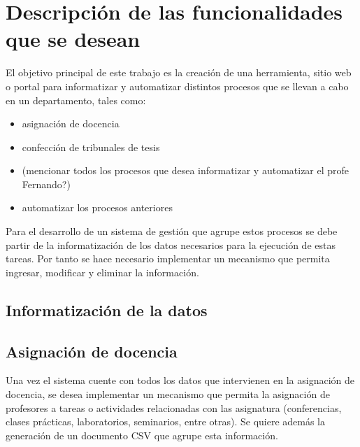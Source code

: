 \chapter{Descripción de las funcionalidades que se desean}\label{chapter:features}
El objetivo principal de este trabajo es la creación de
una herramienta, sitio web o portal para informatizar
y automatizar distintos procesos que se llevan a cabo 
en un departamento, tales como:

\begin{itemize}
    \item asignación de docencia
    \item confección de tribunales de tesis
    \item (mencionar todos los procesos que desea informatizar y automatizar el profe Fernando?)
    \item automatizar los procesos anteriores
\end{itemize}


Para el desarrollo de un sistema de gestión que agrupe estos 
procesos se debe partir de la informatización de los datos necesarios 
para la ejecución de estas tareas. Por tanto se hace necesario 
implementar un mecanismo que permita ingresar, modificar y eliminar
la información. 



\section{Informatización de la datos}





\section{Asignación de docencia}
Una vez el sistema cuente con todos los datos que 
intervienen en la asignación de docencia, se desea 
implementar un mecanismo que permita la asignación
de profesores a tareas o actividades relacionadas
con las asignatura (conferencias, clases prácticas,
laboratorios, seminarios, entre otras).
Se quiere además la generación de un documento
CSV que agrupe esta información.



